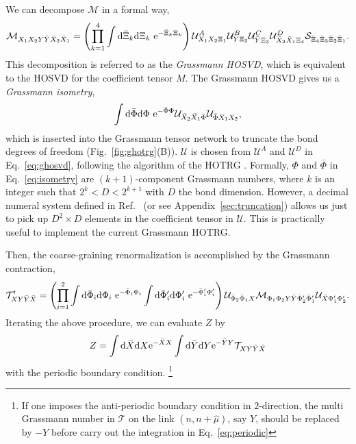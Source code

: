 We can decompose $\mathcal{M}$ in a formal way,
\begin{align}
\label{eq:ghosvd}
	\mathcal{M}_{X_{1}X_{2}Y\bar{Y}\bar{X}_{2}\bar{X}_{1}}
=\left(\prod_{k=1}^{4}\int\mathrm{d}\bar{\Xi}_{k}\mathrm{d}\Xi_{k}~\mathrm{e}^{-\bar{\Xi}_{k}\Xi_{k}}\right) 
\mathcal{U}^{A}_{X_{1}X_{2}\Xi_{1}}\mathcal{U}^{B}_{Y\Xi_{2}}\mathcal{U}^{C}_{\bar{Y}\Xi_{3}} 
\mathcal{U}^{D}_{\bar{X}_{2}\bar{X}_{1}\Xi_{4}}\mathcal{S}_{\bar{\Xi}_{4}\bar{\Xi}_{3}\bar{\Xi}_{2}\bar{\Xi}_{1}}.
\end{align}
This decomposition is referred to as the {\it Grassmann HOSVD}, which is equivalent to the HOSVD 
for the coefficient tensor $M$. The Grassmann HOSVD gives us a {\it Grassmann isometry},
\begin{align}
\label{eq:isometry}
	\int\mathrm{d}\bar{\Phi}\mathrm{d}\Phi~\mathrm{e}^{-\bar{\Phi}\Phi}\mathcal{U}_{\bar{X}_{2}\bar{X}_{1}\Phi}\mathcal{U}_{\bar{\Phi} X_{1} X_{2}},
\end{align}
which is inserted into the Grassmann tensor network to truncate the bond degrees of 
freedom (Fig.~\ref{fig:ghotrg}(B)). $\mathcal{U}$ is chosen from $\mathcal{U}^{A}$ and $\mathcal{U}^{D}$ in 
Eq.~\eqref{eq:ghosvd}, following the algorithm of the HOTRG \cite{PhysRevB.86.045139}. 
Formally, $\Phi$ and $\bar{\Phi}$ in Eq.~\eqref{eq:isometry} are $(k+1)$-component 
Grassmann numbers, where $k$ is an integer such that $2^{k}<D<2^{k+1}$ with $D$ 
the bond dimension. However, a decimal numeral system defined in
 Ref.~\cite{Kadoh} (or see Appendix~\ref{sec:truncation}) allows us just 
to pick up $D^{2}\times D$ elements in the coefficient tensor in $\mathcal{U}$. 
This is practically useful to implement the current Grassmann HOTRG. 

Then, the coarse-graining renormalization is accomplished by the Grassmann contraction,
\begin{align}
	\mathcal{T}'_{X Y\bar{Y}\bar{X}}=\left(\prod_{i=1}^{2}\int\mathrm{d}\bar{\Phi}_{i}
\mathrm{d}\Phi_{i}~\mathrm{e}^{-\bar{\Phi}_{i}\Phi_{i}}\int\mathrm{d}\bar{\Phi}'_{i}\mathrm{d}\Phi'_{i}~\mathrm{e}^{-\bar{\Phi}'_{i}\Phi'_{i}}\right)
\mathcal{U}_{\bar{\Phi}_{2}\bar{\Phi}_{1}X}
\mathcal{M}_{\Phi_{1}\Phi_{2}Y\bar{Y}\bar{\Phi}'_{2}\bar{\Phi}'_{1}}\mathcal{U}_{\bar{X}\Phi'_{1}\Phi'_{2}}.
\end{align}
Iterating the above procedure, we can evaluate $Z$ by
\begin{align}
\label{eq:periodic}
	Z=\int\mathrm{d}\bar{X}\mathrm{d} X \mathrm{e}^{-\bar{X} X }\int\mathrm{d}\bar{Y}\mathrm{d} Y\mathrm{e}^{-\bar{Y} Y}\mathcal{T}_{X Y\bar{Y}\bar{X}}
\end{align}
with the periodic boundary condition. \footnote{If one imposes the anti-periodic boundary condition in $2$-direction, 
the multi Grassmann number in $\mathcal{T}$ on the link $(n,n+\hat{\mu})$, say $Y$, 
should be replaced by $-Y$ before carry out the integration in Eq.~\eqref{eq:periodic}}

